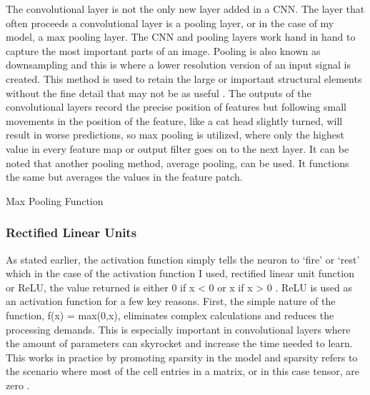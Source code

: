 \documentclass[12pt]{article}
\begin{document}
                The convolutional layer is not the only new layer added in a CNN. 
                The layer that often proceeds a convolutional layer is a pooling layer, or in the case of my model, a max pooling layer.
                The CNN and pooling layers work hand in hand to capture the most important parts of an image. 
                Pooling is also known as downsampling and this is where a lower resolution version of an input signal is created. 
                This method is used to retain the large or important structural elements 
                without the fine detail that may not be as useful \cite{brownlee2020}. 
                The outputs of the convolutional layers record the precise position of features 
                but following small movements in the position of the feature, like a cat head slightly turned, 
                will result in worse predictions, so max pooling is utilized, 
                where only the highest value in every feature map or output filter goes on to the next layer. 
                It can be noted that another pooling method, average pooling, can be used. 
                It functions the same but averages the values in the feature patch.

                Max Pooling Function
            




            \subsubsection{Rectified Linear Units}

                As stated earlier, the activation function simply tells the neuron to ‘fire’ or ‘rest’ 
                which in the case of the activation function I used, rectified linear unit function or ReLU, 
                the value returned is either 0 if x < 0 or x if x > 0 \cite{agarap2019}. 
                ReLU is used as an activation function for a few key reasons. First, the simple nature of the function, 
                f(x) = max(0,x), eliminates complex calculations and reduces the processing demands. 
                This is especially important in convolutional layers where the amount of parameters can skyrocket 
                and increase the time needed to learn. This works in practice by promoting sparsity in the model 
                and sparsity refers to the scenario where most of the cell entries in a matrix, 
                or in this case tensor, are zero \cite{giskard}.
\end{document}
